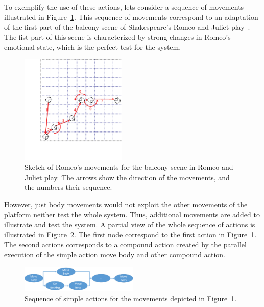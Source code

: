 To exemplify the use of these actions, lets consider a sequence of movements illustrated in Figure~\ref{fig:triskar_test}. This sequence of movements correspond to an adaptation of the first part of the balcony scene of Shakespeare's Romeo and Juliet play~\cite{RAndJ}. The fist part of this scene is characterized by strong changes in Romeo's emotional state, which is the perfect test for the system.  
\begin{figure}
	\centering
	\includegraphics[width=0.45\textwidth]{./Images/FourthCaseSceneB.png}
	\caption{Sketch of Romeo's movements for the balcony scene in Romeo and Juliet play. The arrows show the direction of the movements, and the numbers their sequence.}
	\label{fig:triskar_test}
\end{figure} 
However, just body movements would not exploit the other movements of the platform neither test the whole system. Thus, additional movements are added to illustrate and test the system. A partial view of the whole sequence of actions is illustrated in Figure~\ref{fig:sequence_actions}. The first node correspond to the first action in Figure~\ref{fig:triskar_test}. The second actions corresponds to a compound action created by the parallel execution of the simple action move body and other compound action.

\begin{figure}
	\centering
	\includegraphics[width=0.5\textwidth]{./Images/sequenceActions.png}
	\caption{Sequence of simple actions for the movements depicted in Figure~\ref{fig:triskar_test}.}
	\label{fig:sequence_actions}
\end{figure}